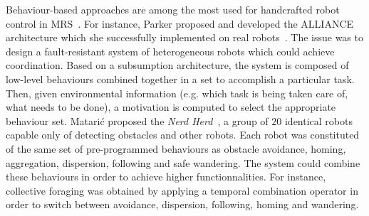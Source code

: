       Behaviour-based approaches are among the most used for handcrafted robot control in MRS~\parencite{Arkin1998, Mataric2008, Parker2008}. For instance, Parker proposed and developed the ALLIANCE architecture which she successfully implemented on real robots~\parencite{Parker1994}. The issue was to design a fault-resistant system of heterogeneous robots which could achieve coordination. Based on a subsumption architecture, the system is composed of low-level behaviours combined together in a set to accomplish a particular task. Then, given environmental information (e.g. which task is being taken care of, what needs to be done), a motivation is computed to select the appropriate behaviour set. Matarić proposed the \emph{Nerd Herd}~\parencite{Mataric1995}, a group of $20$ identical robots capable only of detecting obstacles and other robots. Each robot was constituted of the same set of pre-programmed behaviours as obstacle avoidance, homing, aggregation, dispersion, following and safe wandering. The system could combine these behaviours in order to achieve higher functionnalities. For instance, collective foraging was obtained by applying a temporal combination operator in order to switch between avoidance, dispersion, following, homing and wandering. 








